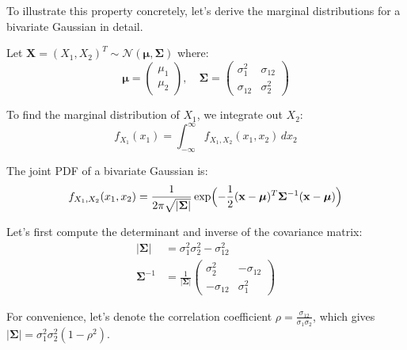 \documentclass{article}
\begin{document}
To illustrate this property concretely, let's derive the marginal distributions for a bivariate Gaussian in detail.

Let $\mathbf{X} = (X_1, X_2)^T \sim \mathcal{N}(\boldsymbol{\mu}, \boldsymbol{\Sigma})$ where:
\[
\boldsymbol{\mu} = \begin{pmatrix} \mu_1 \\ \mu_2 \end{pmatrix}, \quad
\boldsymbol{\Sigma} = \begin{pmatrix} \sigma_1^2 & \sigma_{12} \\ \sigma_{12} & \sigma_2^2 \end{pmatrix}
\]

To find the marginal distribution of $X_1$, we integrate out $X_2$:
\[
f_{X_1}(x_1) = \int_{-\infty}^{\infty} f_{X_1,X_2}(x_1, x_2) \, dx_2
\]

The joint PDF of a bivariate Gaussian is:
\[
f_{X_1,X_2}(x_1, x_2) = \frac{1}{2\pi\sqrt{|\boldsymbol{\Sigma}|}} \exp\Bigl(-\frac{1}{2}(\mathbf{x}-\boldsymbol{\mu})^T \boldsymbol{\Sigma}^{-1} (\mathbf{x}-\boldsymbol{\mu})\Bigr)
\]

Let's first compute the determinant and inverse of the covariance matrix:
\begin{align*}
|\boldsymbol{\Sigma}| &= \sigma_1^2\sigma_2^2 - \sigma_{12}^2\\
\boldsymbol{\Sigma}^{-1} &= \frac{1}{|\boldsymbol{\Sigma}|} \begin{pmatrix} \sigma_2^2 & -\sigma_{12} \\ -\sigma_{12} & \sigma_1^2 \end{pmatrix}
\end{align*}

For convenience, let's denote the correlation coefficient $\rho = \frac{\sigma_{12}}{\sigma_1\sigma_2}$, which gives $|\boldsymbol{\Sigma}| = \sigma_1^2\sigma_2^2(1-\rho^2)$.
\end{document}
